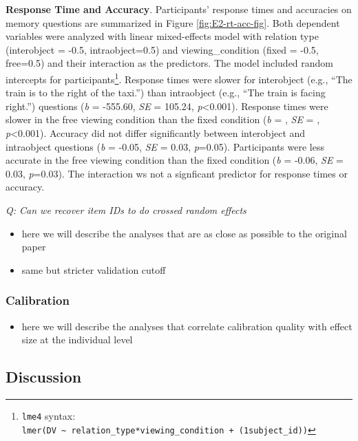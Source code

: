 \documentclass[
  english,
  man,floatsintext]{apa6}
\providecommand{\tightlist}{%
  \setlength{\itemsep}{0pt}\setlength{\parskip}{0pt}}
\begin{document}
\textbf{Response Time and Accuracy}. Participants' response times and accuracies on memory questions are summarized in Figure \ref{fig:E2-rt-acc-fig}. Both dependent variables were analyzed with linear mixed-effects model with relation type (interobject = -0.5, intraobject=0.5) and viewing\_condition (fixed = -0.5, free=0.5) and their interaction as the predictors. The model included random intercepts for participants\footnote{ \texttt{lme4} syntax: \texttt{lmer(DV\ \textasciitilde{}\ relation\_type*viewing\_condition\ +\ (1\textbar{}subject\_id))}}. Response times were slower for interobject (e.g., ``The train is to the right of the taxi.'') than intraobject (e.g., ``The train is facing right.'') questions (\emph{b} = -555.60, \emph{SE} = 105.24, \emph{p}\textless0.001). Response times were slower in the free viewing condition than the fixed condition (\emph{b} = , \emph{SE} = , \emph{p}\textless0.001). Accuracy did not differ significantly between interobject and intraobject questions (\emph{b} = -0.05, \emph{SE} = 0.03, \emph{p}=0.05). Participants were less accurate in the free viewing condition than the fixed condition (\emph{b} = -0.06, \emph{SE} = 0.03, \emph{p}=0.03). The interaction ws not a signficant predictor for response times or accuracy.

\emph{Q: Can we recover item IDs to do crossed random effects}

\begin{itemize}
\item
  here we will describe the analyses that are as close as possible to the original paper
\item
  same but stricter validation cutoff
\end{itemize}

\hypertarget{calibration-1}{%
\subsubsection{Calibration}\label{calibration-1}}

\begin{itemize}
\tightlist
\item
  here we will describe the analyses that correlate calibration quality with effect size at the individual level
\end{itemize}

\hypertarget{discussion-1}{%
\subsection{Discussion}\label{discussion-1}}
\end{document}
